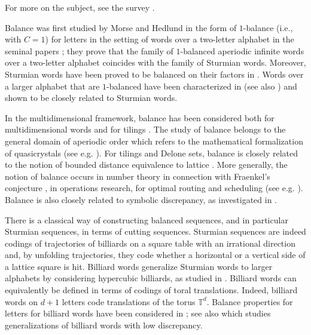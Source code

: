 \documentclass{article}
\theoremstyle{definition}
\newcommand{\T}{\mathbb{T}}
\begin{document}
For more on the subject, see the survey \cite{Vuillon:03}. 

Balance was first studied by Morse and Hedlund  in the form of $1$-balance (i.e., with $C=1$) for letters   in the setting of words over  a two-letter alphabet in the seminal papers \cite{MorseHedlund:38,MorseHedlund:40}; they  prove that the family   of $1$-balanced aperiodic infinite words over a two-letter alphabet  coincides with the family of   Sturmian words.    Moreover, Sturmian words   have been proved to be  balanced on their factors in \cite{FagnotVuillon:02}.
Words over a larger alphabet that  are $1$-balanced have been characterized in \cite{Hubert:00} (see also \cite{Graham:73}) and shown to be closely related to Sturmian words.  



 
 
 In the multidimensional framework, balance has been considered  both for    multidimensional words
 \cite{BerTij:2002} and  for tilings  \cite{Sadun:16}.   
The  study of balance belongs to the  general domain of  aperiodic order  which    refers to the mathematical   formalization of quasicrystals (see e.g. \cite{BaakeGrimm}). For tilings and  Delone sets, balance is   closely related to the notion of   bounded distance equivalence to  lattice   \cite{Lacz:92,HayKeKo:17}. 
More generally, the notion of balance  occurs in number theory  in  connection with  Fraenkel's  conjecture \cite{Fraenkel:73,Tijdeman:2000},  in operations research, for optimal routing  and scheduling (see e.g.  \cite{AltmanGH:00,BraunerCrama:04,BraunerJost:08,Tijdeman:80}). Balance  is   also  closely related to  symbolic discrepancy, as   
investigated in \cite{Adam:03,Adam:04}.  

There is a classical way of constructing balanced sequences, and in particular Sturmian sequences, in terms of cutting sequences. 
 Sturmian sequences are  indeed codings of trajectories of billiards on a square table with an irrational direction and, by unfolding trajectories, they code whether a horizontal or a vertical side of a lattice square is hit. Billiard words  generalize Sturmian words 
 to larger alphabets by considering  hypercubic  billiards, as   studied in  \cite{Ar.Ma.Sh.Ta.94,Ar.Ma.Sh.Ta.94bis}.
Billiard words can equivalently be defined  in terms of  codings of toral translations. 
Indeed,   billiard words   on $ d+1$ letters code   translations of  the   torus $\T^d$.  Balance properties for letters  for billiard words have   been  considered in \cite{Andrieu,Andrieu-Vivion-23}; see also  \cite{BCCSY} which studies
 generalizations of billiard words with low discrepancy.   
\end{document}
